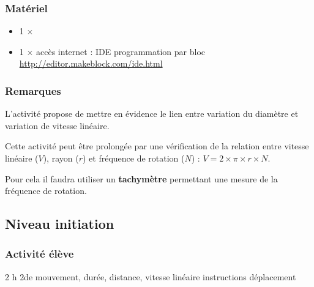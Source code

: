 \subsubsection{Matériel}
\begin{itemize}

    \item 1 $\times$ \matosMbot
   \item 1 $\times$ accès internet : IDE programmation par bloc \url{http://editor.makeblock.com/ide.html}
    
\end{itemize}



\subsubsection{Remarques}


\begin{methode}
    L'activité propose de mettre en évidence le lien entre variation du diamètre et variation de vitesse linéaire.
    
    Cette activité peut être prolongée par une vérification de la relation entre vitesse linéaire ($V$), rayon ($r$) et fréquence de rotation ($N$) : $V = 2 \times \pi \times r \times N$.
    
    Pour cela il faudra utiliser un \textbf{tachymètre} permettant une mesure de la fréquence de rotation.
    
\end{methode}

%
%

\newpage

\subsection{Niveau initiation}

\subsubsection{Activité élève}

\cartouche
{2 h}         %
{2de}           %
{}        %
{mouvement, durée, distance, vitesse linéaire}     %
{instructions déplacement}       %


